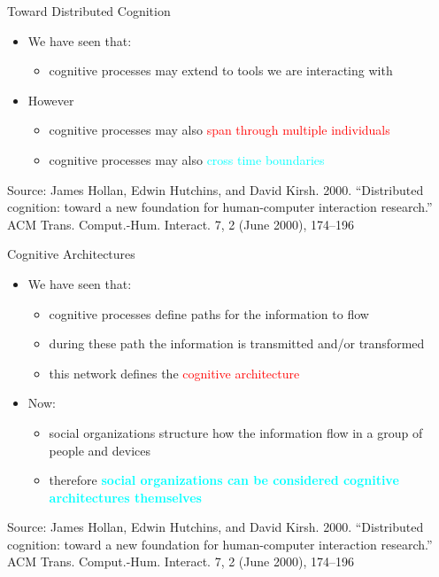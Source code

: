 \documentclass{beamer}
\begin{document}
 
\begin{frame}
{\centerline{Toward Distributed Cognition}}

\begin{itemize}
\item We have seen that:
\begin{itemize}
    \item cognitive processes may extend to tools we are interacting with
\end{itemize}
\item However
\begin{itemize}
    \item cognitive processes may also \textcolor{red}{span through multiple individuals}
    \item cognitive processes may also \textcolor{cyan}{cross time boundaries}
\end{itemize}
\end{itemize}

\begin{center}
    \tiny{Source: James Hollan, Edwin Hutchins, and David Kirsh. 2000. ``Distributed cognition: toward a new foundation for human-computer interaction research.'' ACM Trans. Comput.-Hum. Interact. 7, 2 (June 2000), 174–196}
\end{center}

\end{frame}

\begin{frame}
{\centerline{Cognitive Architectures}}

\begin{itemize}
\item We have seen that:
\begin{itemize}
    \item cognitive processes define paths for the information to flow
    \item during these path the information is transmitted and/or transformed
    \item this network defines the \textcolor{red}{cognitive architecture}  
\end{itemize}
\item Now:
\begin{itemize}
    \item social organizations structure how the information flow in a group of people and devices 
    \item therefore \textcolor{cyan}{\bf social organizations can be considered cognitive architectures themselves}
\end{itemize}
\end{itemize}

\begin{center}
    \tiny{Source: James Hollan, Edwin Hutchins, and David Kirsh. 2000. ``Distributed cognition: toward a new foundation for human-computer interaction research.'' ACM Trans. Comput.-Hum. Interact. 7, 2 (June 2000), 174–196}
\end{center}

\end{frame}
\end{document}
